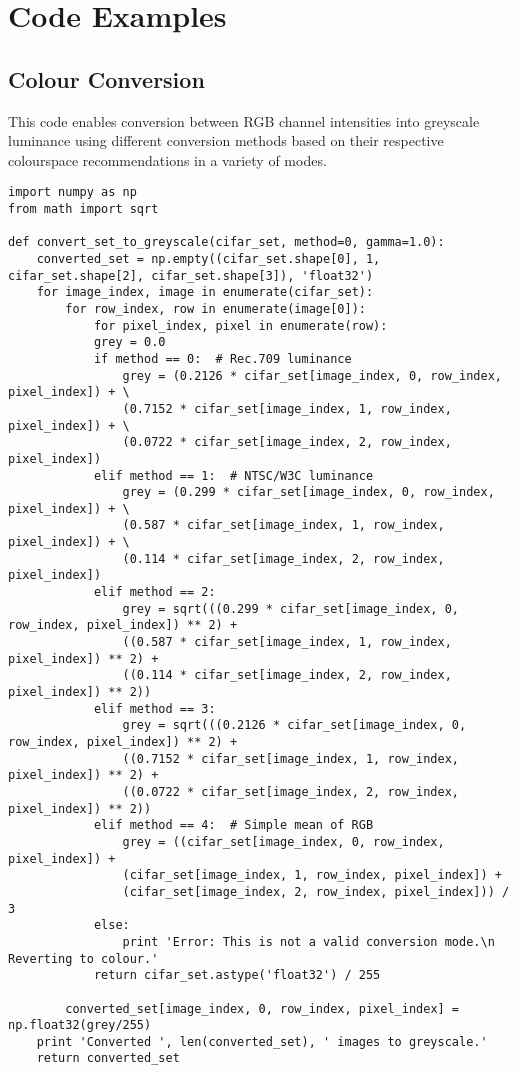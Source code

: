 \chapter{Code Examples}

\section{Colour Conversion}

This code enables conversion between RGB channel intensities into greyscale luminance using different conversion methods based on their respective colourspace recommendations in a variety of modes.

\begin{lstlisting}
import numpy as np
from math import sqrt

def convert_set_to_greyscale(cifar_set, method=0, gamma=1.0):
	converted_set = np.empty((cifar_set.shape[0], 1, cifar_set.shape[2], cifar_set.shape[3]), 'float32')
	for image_index, image in enumerate(cifar_set):
		for row_index, row in enumerate(image[0]):
			for pixel_index, pixel in enumerate(row):
			grey = 0.0
			if method == 0:  # Rec.709 luminance
				grey = (0.2126 * cifar_set[image_index, 0, row_index, pixel_index]) + \
				(0.7152 * cifar_set[image_index, 1, row_index, pixel_index]) + \
				(0.0722 * cifar_set[image_index, 2, row_index, pixel_index])
			elif method == 1:  # NTSC/W3C luminance
				grey = (0.299 * cifar_set[image_index, 0, row_index, pixel_index]) + \
				(0.587 * cifar_set[image_index, 1, row_index, pixel_index]) + \
				(0.114 * cifar_set[image_index, 2, row_index, pixel_index])
			elif method == 2:
				grey = sqrt(((0.299 * cifar_set[image_index, 0, row_index, pixel_index]) ** 2) +
				((0.587 * cifar_set[image_index, 1, row_index, pixel_index]) ** 2) +
				((0.114 * cifar_set[image_index, 2, row_index, pixel_index]) ** 2))
			elif method == 3:
				grey = sqrt(((0.2126 * cifar_set[image_index, 0, row_index, pixel_index]) ** 2) +
				((0.7152 * cifar_set[image_index, 1, row_index, pixel_index]) ** 2) +
				((0.0722 * cifar_set[image_index, 2, row_index, pixel_index]) ** 2))
			elif method == 4:  # Simple mean of RGB
				grey = ((cifar_set[image_index, 0, row_index, pixel_index]) +
				(cifar_set[image_index, 1, row_index, pixel_index]) +
				(cifar_set[image_index, 2, row_index, pixel_index])) / 3
			else:
				print 'Error: This is not a valid conversion mode.\n Reverting to colour.'
			return cifar_set.astype('float32') / 255
		
		converted_set[image_index, 0, row_index, pixel_index] = np.float32(grey/255)
	print 'Converted ', len(converted_set), ' images to greyscale.'
	return converted_set
 
\end{lstlisting}
